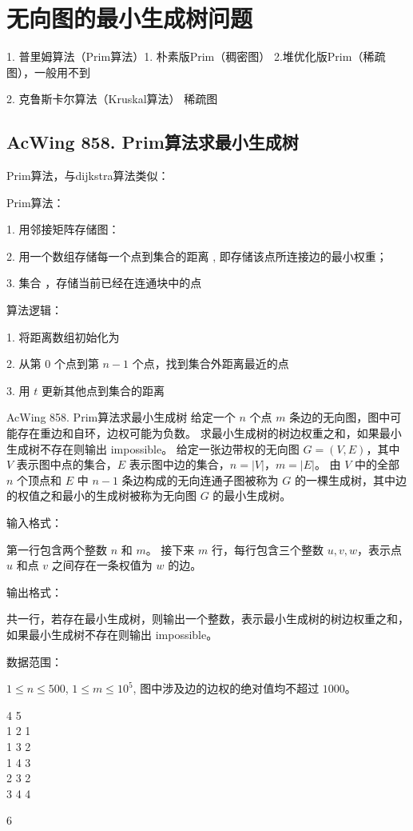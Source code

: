 \section{无向图的最小生成树问题}

1. 普里姆算法（Prim算法）1. 朴素版Prim（稠密图） 2.堆优化版Prim（稀疏图），一般用不到

2. 克鲁斯卡尔算法（Kruskal算法） 稀疏图

\subsection{AcWing 858. Prim算法求最小生成树}
Prim算法，与dijkstra算法类似：

Prim算法：

1. 用邻接矩阵存储图：

2. 用一个数组存储每一个点到集合的距离 , 即存储该点所连接边的最小权重；

3. 集合 ，存储当前已经在连通块中的点

算法逻辑：

1. 将距离数组初始化为 

2. 从第 $0$ 个点到第 $n - 1$ 个点，找到集合外距离最近的点 

3. 用 $t$ 更新其他点到集合的距离

\begin{titledbox}{AcWing 858. Prim算法求最小生成树}
    给定一个 $n$ 个点 $m$ 条边的无向图，图中可能存在重边和自环，边权可能为负数。 求最小生成树的树边权重之和，如果最小生成树不存在则输出 impossible。 给定一张边带权的无向图 $G=(V, E)$，其中 $V$ 表示图中点的集合，$E$ 表示图中边的集合，$n=|V|$，$m=|E|$。 由 $V$ 中的全部 $n$ 个顶点和 $E$ 中 $n-1$ 条边构成的无向连通子图被称为 $G$ 的一棵生成树，其中边的权值之和最小的生成树被称为无向图 $G$ 的最小生成树。

    输入格式：

    第一行包含两个整数 $n$ 和 $m$。 接下来 $m$ 行，每行包含三个整数 $u,v,w$，表示点 $u$ 和点 $v$ 之间存在一条权值为 $w$ 的边。

    输出格式：

    共一行，若存在最小生成树，则输出一个整数，表示最小生成树的树边权重之和，如果最小生成树不存在则输出 impossible。

    数据范围：

    $1 \le n \le 500$, $1 \le m \le 10^5$, 图中涉及边的边权的绝对值均不超过 $1000$。

    \begin{inputblock}
        4 5 \\
        1 2 1 \\
        1 3 2 \\
        1 4 3 \\
        2 3 2 \\
        3 4 4
    \end{inputblock}
    \begin{outputblock}
        6
    \end{outputblock}
\end{titledbox}

